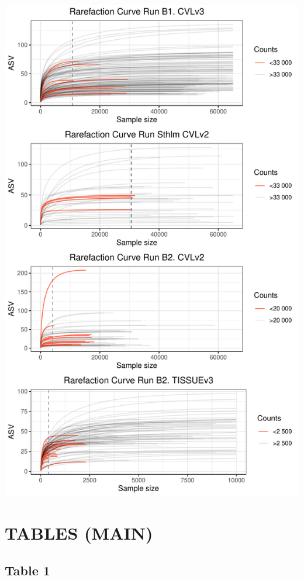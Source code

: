 \documentclass[
]{article}
\begin{document}
\includegraphics[width=1\linewidth]{manuscript_template_files/figure-latex/unnamed-chunk-24-6}

\clearpage

\hypertarget{tables-main}{%
\section{TABLES (MAIN)}\label{tables-main}}

\hypertarget{table-1}{%
\subsection{Table 1}\label{table-1}}
\end{document}
